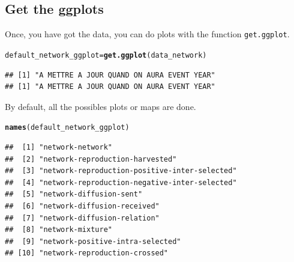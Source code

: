 \documentclass{article}\usepackage[]{graphicx}\usepackage[]{color}
\makeatletter
\newcommand{\hlstd}[1]{\textcolor[rgb]{0.345,0.345,0.345}{#1}}%
\newcommand{\hlkwb}[1]{\textcolor[rgb]{0.69,0.353,0.396}{#1}}%
\newcommand{\hlkwd}[1]{\textcolor[rgb]{0.737,0.353,0.396}{\textbf{#1}}}%
\newenvironment{kframe}{%
 \def\at@end@of@kframe{}%
 \ifinner\ifhmode%
  \def\at@end@of@kframe{\end{minipage}}%
  \begin{minipage}{\columnwidth}%
 \fi\fi%
 \def\FrameCommand##1{\hskip\@totalleftmargin \hskip-\fboxsep
 \colorbox{shadecolor}{##1}\hskip-\fboxsep
     \hskip-\linewidth \hskip-\@totalleftmargin \hskip\columnwidth}%
 \MakeFramed {\advance\hsize-\width
   \@totalleftmargin\z@ \linewidth\hsize
   \@setminipage}}%
 {\par\unskip\endMakeFramed%
 \at@end@of@kframe}
\newenvironment{knitrout}{}{} %
\makeatother
\begin{document}
\subsection{Get the ggplots}

Once, you have got the data, you can do plots with the function \texttt{get.ggplot}.


\begin{knitrout}
\color{fgcolor}\begin{kframe}
\begin{alltt}
\hlstd{default_network_ggplot} \hlkwb{=} \hlkwd{get.ggplot}\hlstd{(data_network)}
\end{alltt}


{\ttfamily\noindent\itshape{}}\begin{verbatim}
## [1] "A METTRE A JOUR QUAND ON AURA EVENT YEAR"
## [1] "A METTRE A JOUR QUAND ON AURA EVENT YEAR"
\end{verbatim}
\end{kframe}
\end{knitrout}

By default, all the possibles plots or maps are done.

\begin{knitrout}
\color{fgcolor}\begin{kframe}
\begin{alltt}
\hlkwd{names}\hlstd{(default_network_ggplot)}
\end{alltt}
\begin{verbatim}
##  [1] "network-network"                             
##  [2] "network-reproduction-harvested"              
##  [3] "network-reproduction-positive-inter-selected"
##  [4] "network-reproduction-negative-inter-selected"
##  [5] "network-diffusion-sent"                      
##  [6] "network-diffusion-received"                  
##  [7] "network-diffusion-relation"                  
##  [8] "network-mixture"                             
##  [9] "network-positive-intra-selected"             
## [10] "network-reproduction-crossed"
\end{verbatim}
\end{kframe}
\end{knitrout}
\end{document}
